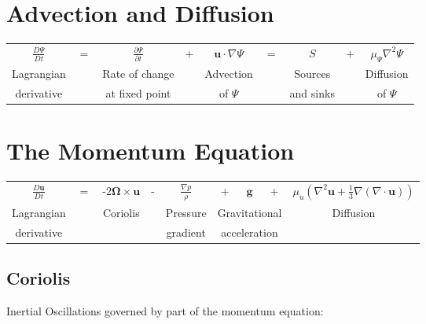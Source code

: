 \section{Advection and Diffusion\label{sec:Advection-of-Pollution}}
\begin{center}
\begin{tabular}{ccccccccc}
$\frac{D\Psi}{Dt}$ & $=$ & $\frac{\partial\Psi}{\partial t}$ & $+$ & $\mathbf{u}\cdot\nabla\Psi$ & $=$ & $S$ & $+$ & $\mu_{\Psi}\nabla^{2}\Psi$\tabularnewline
Lagrangian &  & Rate of change &  & Advection &  & Sources &  & Diffusion\tabularnewline
derivative &  & at fixed point &  & of $\Psi$ &  & and sinks &  & of $\Psi$\tabularnewline
\end{tabular}
\par\end{center}


\section{The Momentum Equation\label{sec:momEqn}}
\begin{center}
\begin{tabular}{ccccccccc}
$\frac{D\mathbf{u}}{Dt}$ & $=$ & $\text{-}2\bm{\Omega}\times\mathbf{u}$ & - & $\frac{\nabla p}{\rho}$ & + & $\mathbf{g}$ & $+$ & $\mu_{u}\left(\nabla^{2}\mathbf{u}+\frac{1}{3}\nabla(\nabla\cdot\mathbf{u})\right)$\tabularnewline
Lagrangian &  & Coriolis &  & Pressure & \multicolumn{3}{c}{Gravitational} & Diffusion\tabularnewline
derivative &  &  &  & gradient & \multicolumn{3}{c}{acceleration} & \tabularnewline
\end{tabular}
\par\end{center}

\subsection{Coriolis\label{subsec:Coriolis}}

Inertial Oscillations governed by part of the momentum equation:

